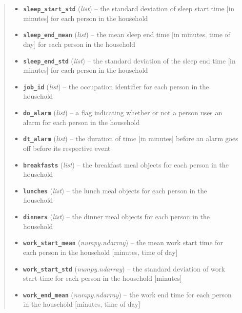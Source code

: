 \documentclass[letterpaper,10pt,english]{sphinxmanual}
\begin{document}
\begin{fulllineitems}
\begin{quote}
\begin{description}
\begin{itemize}
\item {} 
\textbf{\texttt{sleep\_start\_std}} (\emph{list}) -- the standard deviation of sleep start time {[}in minutes{]} for each person in the     household

\item {} 
\textbf{\texttt{sleep\_end\_mean}} (\emph{list}) -- the mean sleep end time {[}in minutes, time of day{]} for each person in the household

\item {} 
\textbf{\texttt{sleep\_end\_std}} (\emph{list}) -- the standard deviation of the sleep end time {[}in minutes{]} for each person in     the household

\item {} 
\textbf{\texttt{job\_id}} (\emph{list}) -- the occupation identifier for each person in the household

\item {} 
\textbf{\texttt{do\_alarm}} (\emph{list}) -- a flag indicating whether or not a person uses an alarm for each person in the household

\item {} 
\textbf{\texttt{dt\_alarm}} (\emph{list}) -- the duration of time {[}in minutes{]} before an alarm goes off before its respective event

\item {} 
\textbf{\texttt{breakfasts}} (\emph{list}) -- the breakfast meal objects for each person in the household

\item {} 
\textbf{\texttt{lunches}} (\emph{list}) -- the lunch meal objects for each person in the household

\item {} 
\textbf{\texttt{dinners}} (\emph{list}) -- the dinner meal objects for each person in the household

\item {} 
\textbf{\texttt{work\_start\_mean}} (\emph{numpy.ndarray}) -- the mean work start time for each person in the household     {[}minutes, time of day{]}

\item {} 
\textbf{\texttt{work\_start\_std}} (\emph{numpy.ndarray}) -- the standard deviation of work start time for each person in the     household {[}minutes{]}

\item {} 
\textbf{\texttt{work\_end\_mean}} (\emph{numpy.ndarray}) -- the work end time for each person in the household {[}minutes, time of day{]}


\end{itemize}
\end{description}
\end{quote}
\end{fulllineitems}
\end{document}
